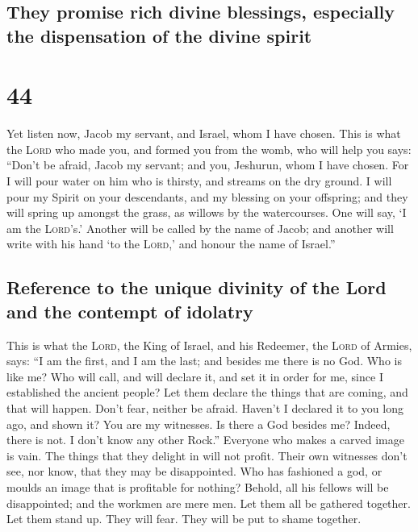 \hypertarget{they-promise-rich-divine-blessings-especially-the-dispensation-of-the-divine-spirit}{%
\subsection{They promise rich divine blessings, especially the
dispensation of the divine
spirit}\label{they-promise-rich-divine-blessings-especially-the-dispensation-of-the-divine-spirit}}

\hypertarget{section-43}{%
\section{44}\label{section-43}}

 Yet listen now, Jacob my servant, and Israel, whom I have
chosen.  This is what the \textsc{Lord} who made you, and
formed you from the womb, who will help you says: ``Don't be afraid,
Jacob my servant; and you, Jeshurun, whom I have chosen. 
For I will pour water on him who is thirsty, and streams on the dry
ground. I will pour my Spirit on your descendants, and my blessing on
your offspring;  and they will spring up amongst the
grass, as willows by the watercourses.  One will say, `I
am the \textsc{Lord}'s.' Another will be called by the name of Jacob;
and another will write with his hand `to the \textsc{Lord},' and honour
the name of Israel.''

\hypertarget{reference-to-the-unique-divinity-of-the-lord-and-the-contempt-of-idolatry}{%
\subsection{Reference to the unique divinity of the Lord and the
contempt of
idolatry}\label{reference-to-the-unique-divinity-of-the-lord-and-the-contempt-of-idolatry}}

 This is what the \textsc{Lord}, the King of Israel, and
his Redeemer, the \textsc{Lord} of Armies, says: ``I am the first, and I
am the last; and besides me there is no God.  Who is like
me? Who will call, and will declare it, and set it in order for me,
since I established the ancient people? Let them declare the things that
are coming, and that will happen.  Don't fear, neither be
afraid. Haven't I declared it to you long ago, and shown it? You are my
witnesses. Is there a God besides me? Indeed, there is not. I don't know
any other Rock.''  Everyone who makes a carved image is
vain. The things that they delight in will not profit. Their own
witnesses don't see, nor know, that they may be disappointed.
 Who has fashioned a god, or moulds an image that is
profitable for nothing?  Behold, all his fellows will be
disappointed; and the workmen are mere men. Let them all be gathered
together. Let them stand up. They will fear. They will be put to shame
together.

